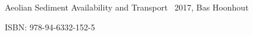 \thispagestyle{empty}

\hfill

\vfill

\noindent Aeolian Sediment Availability and Transport \textcopyright\ 2017, Bas Hoonhout



\bigskip

\noindent ISBN: 978-94-6332-152-5

